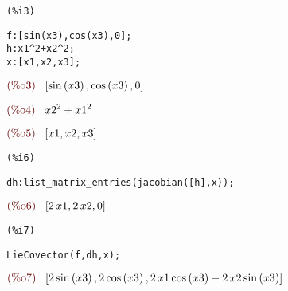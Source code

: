 \noindent
\begin{minipage}[t]{8ex}
\color{red}\bf
\begin{verbatim}
(%i3) 
\end{verbatim}
\end{minipage}
\begin{minipage}[t]{\textwidth}
\color{blue}
\begin{verbatim}
f:[sin(x3),cos(x3),0];
h:x1^2+x2^2;
x:[x1,x2,x3];
\end{verbatim}
\end{minipage}
\begin{math}\displaystyle
\parbox{8ex}{\color{labelcolor}(\%o3) }
[\mathrm{sin}\left( x3\right) ,\mathrm{cos}\left( x3\right) ,0]
\end{math}

\noindent
\begin{math}\displaystyle
\parbox{8ex}{\color{labelcolor}(\%o4) }
{x2}^{2}+{x1}^{2}
\end{math}

\noindent
\begin{math}\displaystyle
\parbox{8ex}{\color{labelcolor}(\%o5) }
[x1,x2,x3]
\end{math}


\noindent
\begin{minipage}[t]{8ex}
\color{red}\bf
\begin{verbatim}
(%i6) 
\end{verbatim}
\end{minipage}
\begin{minipage}[t]{\textwidth}
\color{blue}
\begin{verbatim}
dh:list_matrix_entries(jacobian([h],x));
\end{verbatim}
\end{minipage}
\begin{math}\displaystyle
\parbox{8ex}{\color{labelcolor}(\%o6) }
[2\,x1,2\,x2,0]
\end{math}


\noindent
\begin{minipage}[t]{8ex}
\color{red}\bf
\begin{verbatim}
(%i7) 
\end{verbatim}
\end{minipage}
\begin{minipage}[t]{\textwidth}
\color{blue}
\begin{verbatim}
LieCovector(f,dh,x);
\end{verbatim}
\end{minipage}
\begin{math}\displaystyle
\parbox{8ex}{\color{labelcolor}(\%o7) }
[2\,\mathrm{sin}\left( x3\right) ,2\,\mathrm{cos}\left( x3\right) ,2\,x1\,\mathrm{cos}\left( x3\right) -2\,x2\,\mathrm{sin}\left( x3\right) ]
\end{math}

